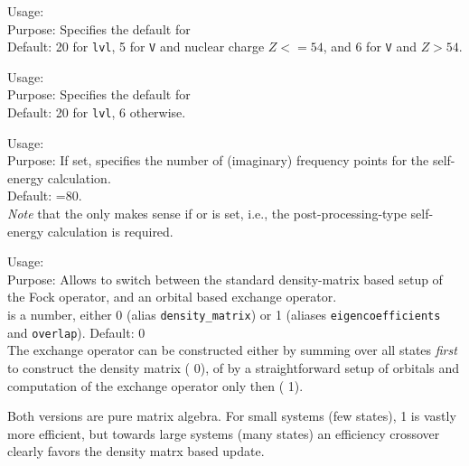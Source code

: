 %
{ \noindent %
  Usage:   \\[1.0ex]
  Purpose: Specifies the default for
  \\[1.0ex]
  Default: 20 for  \texttt{lvl}, 5 for  \texttt{V} and
    nuclear charge $Z<=54$, and 6 for  \texttt{V} and $Z>54$.  }

%
{ \noindent %
  Usage:   \\[1.0ex]
  Purpose: Specifies the default for
  \\[1.0ex]
  Default: 20 for  \texttt{lvl}, 6 otherwise.
}

{ \noindent
  Usage:   \\[1.0ex]
  Purpose: If set, specifies the number of (imaginary) frequency points for the self-energy 
  calculation.\\[1.0ex]  
  Default: =80. \\[1.0ex]
}
\emph{Note} that the  only makes sense if 
 or  is set, i.e., the post-processing-type self-energy calculation 
is required.

{ \noindent
  Usage:   \\[1.0ex]
  Purpose: Allows to switch between the standard density-matrix based
    setup of the Fock operator, and an orbital based exchange
    operator. \\[1.0ex]
   is a number, either 0 (alias \texttt{density\_matrix}) or
  1 (aliases \texttt{eigencoefficients} and \texttt{overlap}). Default: 0 \\
}
The exchange operator can be constructed either by summing over all
states \emph{first} to construct the density matrix (
0), of by a straightforward setup of orbitals and computation of the
exchange operator only then ( 1).

Both versions are pure matrix algebra. For small systems (few states),
 1 is vastly more efficient, but towards large systems
(many states) an efficiency crossover clearly favors the density matrx
based update.

